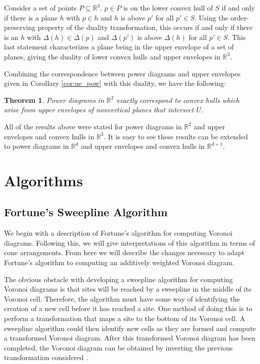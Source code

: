 \documentclass[a4paper, 11pt]{article}
\newtheorem{theorem}{Theorem}[section]
\newcommand{\R}{\mathbb{R}}
\begin{document}
Consider a set of points $P \subseteq \R^3$. $p \in P$ is on the lower convex hull of $S$ if and only if there is a plane $h$ with $p \in h$ and $h$
is above $p'$ for all $p' \in S$. Using the order-preserving property of the duality transformation, this occurs if and only if there is an $h$ with $\Delta(h) \in
\Delta(p)$ and $\Delta(p')$ is above $\Delta(h)$ for all $p' \in S$. This last statement characterizes a plane being in the upper envelope of a set of
planes, giving the duality of lower convex hulls and upper envelopes in $\R^3$.

Combining the correspondence between power diagrams and upper envelopes given in Corollary \ref{cor:ue_pow} with this duality, we have the following:

\begin{theorem}
  Power diagrams in $\R^2$ exactly correspond to convex hulls which arise from upper envelopes of nonvertical planes that intersect $U$.
  \label{thm:ch_pow}
\end{theorem}

All of the results above were stated for power diagrams in $\R^2$ and upper envelopes and convex hulls in $\R^3$. It is easy to see these results can
be extended to power diagrams in $\R^d$ and upper envelopes and convex hulls in $\R^{d+1}$.

\section{Algorithms}

\subsection{Fortune's Sweepline Algorithm}

We begin with a description of Fortune's algorithm for computing Voronoi diagrams. Following this, we will give interpretations of this algorithm in
terms of cone arrangements. From here we will describe the changes necessary to adapt Fortune's algorithm to computing an additively weighted Voronoi
diagram.

The obvious obstacle with developing a sweepline algorithm for computing Voronoi diagrams is that sites will be reached by a sweepline in the middle
of its Voronoi cell. Therefore, the algorithm must have some way of identifying the creation of a new cell before it has reached a site. One method of
doing this is to perform a transformation that maps a site to the bottom of its Voronoi cell. A sweepline algorithm could then identify new cells as
they are formed and compute a transformed Voronoi diagram. After this transformed Voronoi diagram has been completed, the Voronoi diagram can be
obtained by inverting the previous transformation considered \cite{fortune_sweepline}.
\end{document}
